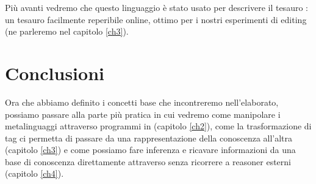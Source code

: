 Più avanti vedremo che questo linguaggio è stato usato per descrivere il tesauro : un tesauro facilmente reperibile online, ottimo per i nostri esperimenti di editing (ne parleremo nel capitolo \ref{ch3}).
\section{Conclusioni}
Ora che abbiamo definito i concetti base che incontreremo nell'elaborato, possiamo passare alla parte più pratica in cui vedremo come manipolare i metalinguaggi attraverso programmi in \cduce (capitolo \ref{ch2}), come la trasformazione di tag ci permetta di passare da una rappresentazione della conoscenza all'altra (capitolo \ref{ch3}) e come possiamo fare inferenza e ricavare informazioni da una base di conoscenza direttamente attraverso \cduce senza ricorrere a reasoner esterni (capitolo \ref{ch4}).